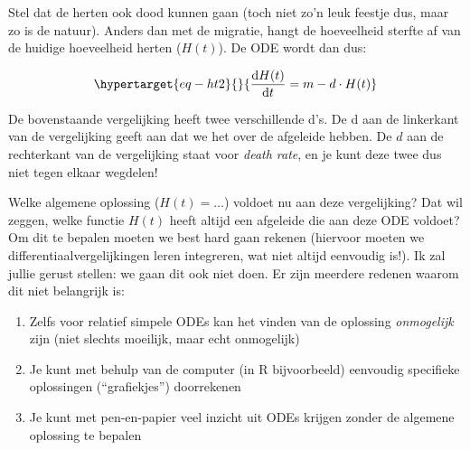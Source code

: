 \documentclass[
  a4paper,
]{scrbook}
\providecommand{\tightlist}{%
  \setlength{\itemsep}{0pt}\setlength{\parskip}{0pt}}\usepackage{longtable,booktabs,array}
\theoremstyle{definition}
\theoremstyle{remark}
\begin{document}
Stel dat de herten ook dood kunnen gaan (toch niet zo'n leuk feestje
dus, maar zo is de natuur). Anders dan met de migratie, hangt de
hoeveelheid sterfte af van de huidige hoeveelheid herten (\(H(t)\)). De
ODE wordt dan dus:

\begin{equation}\protect\hypertarget{eq-ht2}{}{
\mathchoice{\frac{\mathrm{d}H(t)}
{\mathrm{d}t}}{\mathrm{d}H(t)/\mathrm{d}t}
{\mathrm{d}H(t)/\mathrm{d}t}
{\mathrm{d}H(t)/\mathrm{d}t} = m - d \cdot H(t)
}\label{eq-ht2}\end{equation}

\begin{tcolorbox}[enhanced jigsaw, coltitle=black, breakable, bottomtitle=1mm, opacityback=0, colback=white, rightrule=.15mm, title=\textcolor{quarto-callout-important-color}{\faExclamation}\hspace{0.5em}{Let op! \(\mathrm{d}\) en \(d\) zijn niet hetzelfde!}, bottomrule=.15mm, toprule=.15mm, left=2mm, colframe=quarto-callout-important-color-frame, toptitle=1mm, opacitybacktitle=0.6, titlerule=0mm, colbacktitle=quarto-callout-important-color!10!white, leftrule=.75mm, arc=.35mm]

De bovenstaande vergelijking heeft twee verschillende d's. De d aan de
linkerkant van de vergelijking geeft aan dat we het over de afgeleide
hebben. De \(d\) aan de rechterkant van de vergelijking staat voor
\emph{death rate}, en je kunt deze twee dus niet tegen elkaar wegdelen!

\end{tcolorbox}

Welke algemene oplossing (\(H(t)=\dots\)) voldoet nu aan deze
vergelijking? Dat wil zeggen, welke functie \(H(t)\) heeft altijd een
afgeleide die aan deze ODE voldoet? Om dit te bepalen moeten we best
hard gaan rekenen (hiervoor moeten we differentiaalvergelijkingen leren
integreren, wat niet altijd eenvoudig is!). Ik zal jullie gerust
stellen: we gaan dit ook niet doen. Er zijn meerdere redenen waarom dit
niet belangrijk is:

\begin{enumerate}
\def\labelenumi{\arabic{enumi}.}
\tightlist
\item
  Zelfs voor relatief simpele ODEs kan het vinden van de oplossing
  \emph{onmogelijk} zijn (niet slechts moeilijk, maar echt onmogelijk)
\item
  Je kunt met behulp van de computer (in R bijvoorbeeld) eenvoudig
  specifieke oplossingen (``grafiekjes'') doorrekenen
\item
  Je kunt met pen-en-papier veel inzicht uit ODEs krijgen zonder de
  algemene oplossing te bepalen
\end{enumerate}
\end{document}
